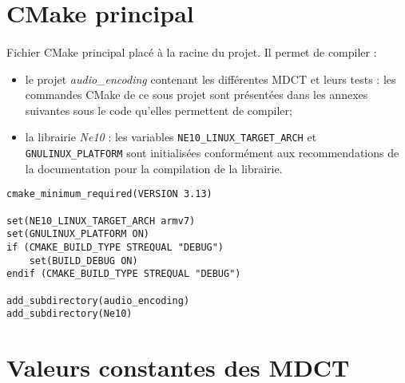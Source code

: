 \documentclass{article}
\begin{document}
\renewcommand{\contentsname}{Liste des annexes}
\tableofcontents

\newpage
\setcounter{page}{1}
\renewcommand{\thesection}{\Alph{section}} 

\section{CMake principal}\label{app:cmake_super}
\paragraph{}
Fichier CMake principal placé à la racine du projet. Il permet de compiler :
\begin{itemize}
    \item le projet \emph{audio\_encoding} contenant les différentes MDCT et leurs tests : les commandes CMake de ce sous projet sont présentées dans les annexes suivantes sous le code qu'elles permettent de compiler;
    \item la librairie \emph{Ne10} : les variables \texttt{NE10\_LINUX\_TARGET\_ARCH} et \texttt{GNULINUX\_PLATFORM} sont initialisées conformément aux recommendations de la documentation pour la compilation de la librairie.
\end{itemize}
\lstset{language=make}
\begin{lstlisting}
cmake_minimum_required(VERSION 3.13)

set(NE10_LINUX_TARGET_ARCH armv7)
set(GNULINUX_PLATFORM ON)
if (CMAKE_BUILD_TYPE STREQUAL "DEBUG")
    set(BUILD_DEBUG ON)
endif (CMAKE_BUILD_TYPE STREQUAL "DEBUG")

add_subdirectory(audio_encoding)
add_subdirectory(Ne10)
\end{lstlisting}


\newpage
\section{Valeurs constantes des MDCT}\label{app:mdct_const}
\end{document}

